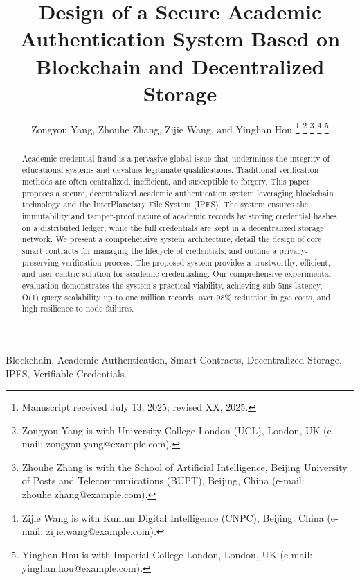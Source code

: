 \documentclass[lettersize,journal]{IEEEtran}
\begin{document}
\title{Design of a Secure Academic Authentication System Based on Blockchain and Decentralized Storage}

\author{Zongyou Yang, Zhouhe Zhang, Zijie Wang, and Yinghan Hou
\thanks{Manuscript received July 13, 2025; revised XX, 2025.}
\thanks{Zongyou Yang is with University College London (UCL), London, UK (e-mail: zongyou.yang@example.com).}
\thanks{Zhouhe Zhang is with the School of Artificial Intelligence, Beijing University of Posts and Telecommunications (BUPT), Beijing, China (e-mail: zhouhe.zhang@example.com).}
\thanks{Zijie Wang is with Kunlun Digital Intelligence (CNPC), Beijing, China (e-mail: zijie.wang@example.com).}
\thanks{Yinghan Hou is with Imperial College London, London, UK (e-mail: yinghan.hou@example.com).}}


\maketitle

\begin{abstract}
Academic credential fraud is a pervasive global issue that undermines the integrity of educational systems and devalues legitimate qualifications. Traditional verification methods are often centralized, inefficient, and susceptible to forgery. This paper proposes a secure, decentralized academic authentication system leveraging blockchain technology and the InterPlanetary File System (IPFS). The system ensures the immutability and tamper-proof nature of academic records by storing credential hashes on a distributed ledger, while the full credentials are kept in a decentralized storage network. We present a comprehensive system architecture, detail the design of core smart contracts for managing the lifecycle of credentials, and outline a privacy-preserving verification process. The proposed system provides a trustworthy, efficient, and user-centric solution for academic credentialing. Our comprehensive experimental evaluation demonstrates the system's practical viability, achieving sub-5ms latency, O(1) query scalability up to one million records, over 98\% reduction in gas costs, and high resilience to node failures.
\end{abstract}

\begin{IEEEkeywords}
Blockchain, Academic Authentication, Smart Contracts, Decentralized Storage, IPFS, Verifiable Credentials.
\end{IEEEkeywords}
\end{document}
